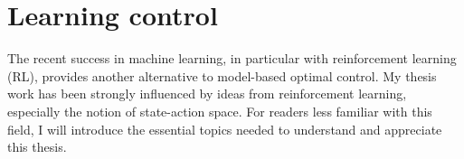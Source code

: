 
\section{Learning control}

The recent success in machine learning, in particular with reinforcement learning (RL), provides another alternative to model-based optimal control. My thesis work has been strongly influenced by ideas from reinforcement learning, especially the notion of state-action space. For readers less familiar with this field, I will introduce the essential topics needed to understand and appreciate this thesis.

